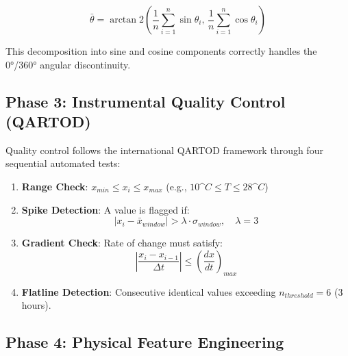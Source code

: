 \documentclass[12pt,a4paper]{article}
\newcommand{\degC}{$^\circ$C}
\begin{document}
\begin{equation}
    \bar{\theta} = \arctan2\left(\frac{1}{n}\sum_{i=1}^{n} \sin\theta_i,\, \frac{1}{n}\sum_{i=1}^{n} \cos\theta_i\right)
    \label{eq:circular_mean}
\end{equation}

This decomposition into sine and cosine components correctly handles the 0°/360° angular discontinuity.

\subsection{Phase 3: Instrumental Quality Control (QARTOD)}
\label{sec:quality_control}

Quality control follows the international QARTOD framework through four sequential automated tests:

\begin{enumerate}
    \item \textbf{Range Check}: $x_{min} \leq x_i \leq x_{max}$ (e.g., $10\degC \leq T \leq 28\degC$)
    
    \item \textbf{Spike Detection}: A value is flagged if:
    \begin{equation}
        |x_i - \bar{x}_{window}| > \lambda \cdot \sigma_{window}, \quad \lambda = 3
        \label{eq:spike}
    \end{equation}
    
    \item \textbf{Gradient Check}: Rate of change must satisfy:
    \begin{equation}
        \left|\frac{x_i - x_{i-1}}{\Delta t}\right| \leq \left(\frac{dx}{dt}\right)_{max}
    \end{equation}
    
    \item \textbf{Flatline Detection}: Consecutive identical values exceeding $n_{threshold} = 6$ (3 hours).
\end{enumerate}

\subsection{Phase 4: Physical Feature Engineering}
\label{sec:feature_engineering}
\end{document}

